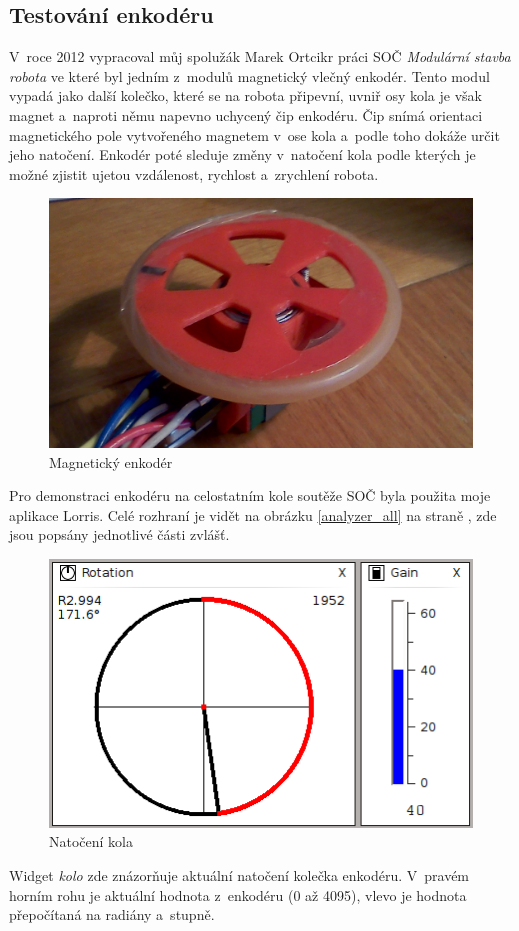 \documentclass[12pt, a4paper, oneside]{article}
\newcommand{\It}{\textit}  %
\begin{document}
\newpage
\subsection{Testování enkodéru}
V~roce 2012 vypracoval můj spolužák Marek Ortcikr práci SOČ \It{Modulární stavba robota} ve které byl jedním z~modulů magnetický vlečný enkodér. Tento modul vypadá jako další kolečko, které se na robota připevní, uvniř osy kola je však magnet a~naproti němu napevno uchycený čip enkodéru. Čip snímá orientaci magnetického pole vytvořeného magnetem v~ose kola a~podle toho dokáže určit jeho natočení. Enkodér poté sleduje změny v~natočení kola podle kterých je možné zjistit ujetou vzdálenost, rychlost a~zrychlení robota.
\begin{figure}[H]
\begin{center}
\includegraphics[width=\textwidth]{img/enc_real.png}
\caption{Magnetický enkodér}
\end{center}
\end{figure}
Pro demonstraci enkodéru na celostatním kole soutěže SOČ byla použita moje aplikace Lorris. Celé rozhraní je vidět na obrázku \ref{analyzer_all} na straně \pageref{analyzer_all}, zde jsou popsány jednotlivé části zvlášť.

\begin{figure}[H]
\begin{center}
\includegraphics[width=\textwidth-45pt]{img/enc_circle.png}
\caption{Natočení kola}
\end{center}
\end{figure}
Widget \It{kolo} zde znázorňuje aktuální natočení kolečka enkodéru. V~pravém horním rohu je aktuální hodnota z~enkodéru (0 až 4095), vlevo je hodnota přepočítaná na radiány a~stupně.
\end{document}

